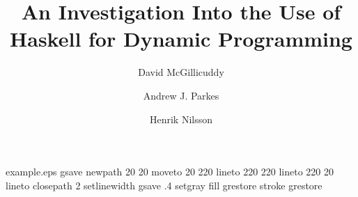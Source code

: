 %
%
%
%
%
\begin{filecontents*}{example.eps}
gsave
newpath
  20 20 moveto
  20 220 lineto
  220 220 lineto
  220 20 lineto
closepath
2 setlinewidth
gsave
  .4 setgray fill
grestore
stroke
grestore
\end{filecontents*}
%
\RequirePackage{fix-cm}
%
\documentclass[smallextended]{svjour3}       %
%
\smartqed  %
%
\usepackage{graphicx}
%
\usepackage{mathptmx}      %
%
\usepackage{epstopdf}
\usepackage{float}

\usepackage{listings}
\usepackage{hyperref}
%
%
%


\title{An Investigation Into the Use of Haskell for Dynamic Programming
}


\author{
	David McGillicuddy \and
	Andrew J. Parkes \and
	Henrik Nilsson
}

